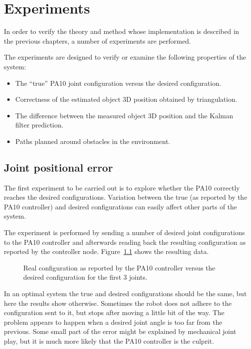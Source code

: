 \chapter{Experiments}
\label{cha:experiments}
In order to verify the theory and method whose implementation is described in the previous chapters, a number of experiments are performed.

The experiments are designed to verify or examine the following properties of the system:
\begin{itemize}
    \item The ``true'' PA10 joint configuration versus the desired configuration.
    \item Correctness of the estimated object 3D position obtained by triangulation.
    \item The difference between the measured object 3D position and the Kalman filter prediction.
    \item Paths planned around obstacles in the environment.
\end{itemize}


\section{Joint positional error}\label{sec:joint_error}
The first experiment to be carried out is to explore whether the PA10 correctly reaches the desired configurations.
Variation between the true (as reported by the PA10 controller) and desired configurations can easily affect other parts of the system.

The experiment is performed by sending a number of desired joint configurations to the PA10 controller and afterwards reading back the resulting configuration as reported by the controller node. Figure~\ref{fig:q_real_desired} shows the resulting data.

\begin{figure}[htb]
    \centering
    \resizebox{.8\columnwidth}{!}{%
        
    }
    \caption{Real configuration as reported by the PA10 controller versus the desired configuration for the first 3 joints.}
    \label{fig:q_real_desired}
\end{figure}

In an optimal system the true and desired configurations should be the same, but here the results show otherwise.
Sometimes the robot does not adhere to the configuration sent to it, but stops after moving a little bit of the way.
The problem appears to happen when a desired joint angle is too far from the previous.
Some small part of the error might be explained by mechanical joint play, but it is much more likely that the PA10 controller is the culprit.

